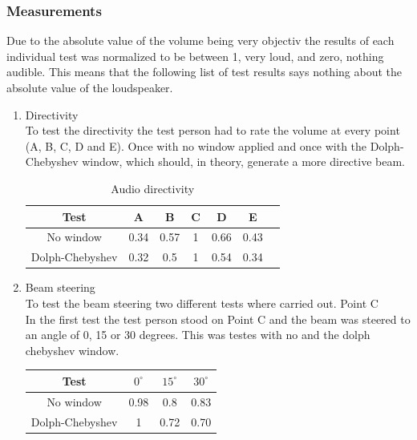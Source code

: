 \subsubsection{Measurements}
Due to the absolute value of the volume being very objectiv the results of each individual test was normalized to be between 1, very loud, and zero, nothing audible. This means that the following list of test results says nothing about the absolute value of the loudspeaker.
\begin{enumerate}
    \item Directivity \\
    To test the directivity the test person had to rate the volume at every point (A, B, C, D and E). Once with no window applied and once with the Dolph-Chebyshev window, which should, in theory, generate a more directive beam.
    \begin{center}
     \begin{table}[h!]
    \centering
    \begin{tabular}{ |c|c|c|c|c|c|c}
      \hline 
      Test & A & B & C & D & E \\ 
      \hline
     No window & 0.34 & 0.57 & 1 & 0.66 & 0.43 \\
     \hline
     Dolph-Chebyshev & 0.32 & 0.5 & 1 & 0.54 & 0.34 \\
     \hline
    \end{tabular}
    \caption{Audio directivity}
    \label{6.1.2_tab:music_audio_volume_directivity}
    \end{table}   
    \end{center}
    \item Beam steering \\
    To test the beam steering two different tests where carried out.
    \subitem Point C\\
    In the first test the test person stood on Point C and the beam was steered to an angle of 0, 15 or 30 degrees. This was testes with no and the dolph chebyshev window.
    \begin{center}
     \begin{table}[h!]
    \centering
    \begin{tabular}{ |c|c|c|c|}
      \hline 
      Test & $0^\circ$ & $15^\circ$ & $30^\circ$ \\ 
      \hline
     No window & 0.98 & 0.8 & 0.83 \\
     \hline
     Dolph-Chebyshev & 1 & 0.72 & 0.70 \\
     \hline
    \end{tabular}

\end{table}
\end{center}
\end{enumerate}
